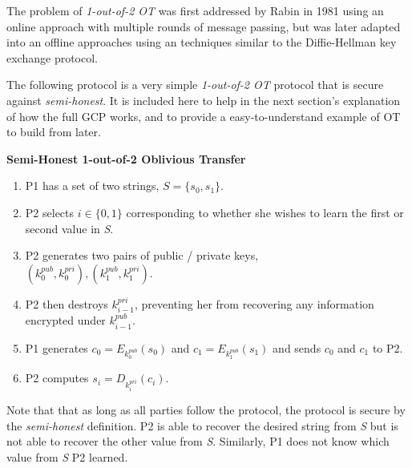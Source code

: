 The problem of \emph{1-out-of-2 \ac{OT}} was first addressed by Rabin\cite{rabin2005exchange} in 1981 using an online approach with multiple rounds of message passing, but was later adapted into an offline approaches using an techniques similar to the Diffie-Hellman key exchange protocol\cite{diffie1976new}.

The following protocol\cite{lindell2013technion} is a very simple \emph{1-out-of-2 \ac{OT}} protocol that is secure against \emph{semi-honest}. It is included here to help in the next section's explanation of how the full \ac{GCP} works, and to provide a easy-to-understand example of \ac{OT} to build from later.

\begin{framed}
    \noindent\textbf{Semi-Honest 1-out-of-2 Oblivious Transfer}
    \begin{enumerate}
        \item \ac{P1} has a set of two strings, $S = \{s_0, s_1\}$.
        \item \ac{P2} selects $i \in \{0, 1\}$ corresponding to whether she wishes to learn the first or second value in \emph{S}.
        \item \ac{P2} generates two pairs of public / private keys,\\
        $(k^{pub}_0, k^{pri}_0), (k^{pub}_1, k^{pri}_1)$.
        \item \ac{P2} then destroys $k^{pri}_{i-1}$, preventing her from recovering any information encrypted under $k^{pub}_{i-1}$.
        \item \ac{P1} generates $c_0 = E_{k^{pub}_0}(s_0)$ and $c_1 = E_{k^{pub}_1}(s_1)$ and sends $c_0$ and $c_1$ to \ac{P2}.
        \item \ac{P2} computes $s_i = D_{k^{pri}_i}(c_i)$.
    \end{enumerate}
\end{framed}

Note that that as long as all parties follow the protocol, the protocol is secure by the \emph{semi-honest} definition. \ac{P2} is able to recover the desired string from \emph{S} but is not able to recover the other value from \emph{S}. Similarly, \ac{P1} does not know which value from \emph{S} \ac{P2} learned.

